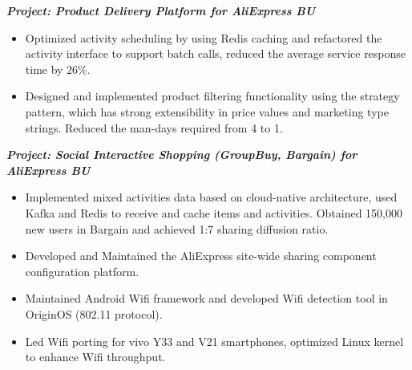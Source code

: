 \documentclass{resume}
\begin{document}

\setlength{\parindent}{1em}


\textit{\textbf{\hspace{1em}Project: Product Delivery Platform for AliExpress BU}}
\begin{itemize}
  \item Optimized activity scheduling by using Redis caching and refactored the activity interface to support batch calls, reduced the average service response time by 26\%.
    \item Designed and implemented product filtering functionality using the strategy pattern, which has strong extensibility in price values and marketing type strings. Reduced the man-days required from 4 to 1.
    
\end{itemize}

\textit{\textbf{Project: Social Interactive Shopping (GroupBuy, Bargain) for AliExpress BU}}
\begin{itemize}
 \item Implemented mixed activities data based on cloud-native architecture, used Kafka and Redis to receive and cache items and activities. Obtained 150,000 new users in Bargain and achieved 1:7 sharing diffusion ratio.
 \item Developed and Maintained the AliExpress site-wide sharing component configuration platform.

\end{itemize}

\begin{itemize}
  \item Maintained Android Wifi framework and developed Wifi detection tool in OriginOS (802.11 protocol).
  \item Led Wifi porting for vivo Y33 and V21 smartphones, optimized Linux kernel to enhance Wifi throughput.
\end{itemize}
\end{document}
